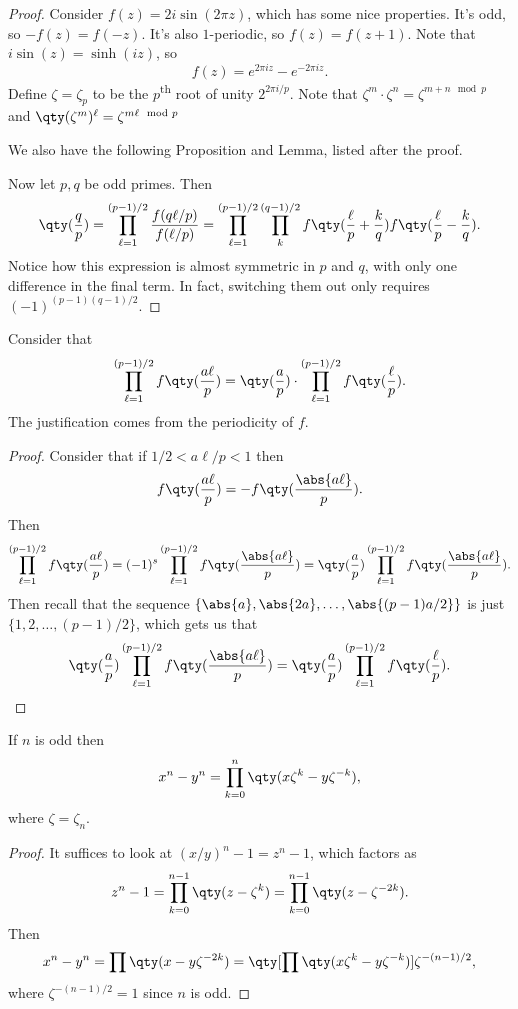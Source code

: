 \begin{proof}
Consider $f(z) = 2i\sin(2\pi z)$, which has some nice properties. It's odd, so $-f(z) = f(-z)$. It's also $1$-periodic, so $f(z) = f(z+1)$. Note that $i \sin(z) = \sinh(iz)$, so 
\[ f(z) = e^{2\pi i z} - e^{-2\pi i z}. \]
Define $\zeta = \zeta_p$ to be the $p$\textsuperscript{th} root of unity $2^{2\pi i/p}$. Note that $\zeta^m \cdot \zeta^n = \zeta^{m+n \mod p}$ and $\qty(\zeta^m)^\ell = \zeta^{m\ell \mod p}$

We also have the following Proposition and Lemma, listed after the proof.

Now let $p,q$ be odd primes. Then 
\[ \qty(\frac{q}{p}) = \prod_{\ell=1}^{(p-1)/2} \frac{f(q\ell/p)}{f(\ell/p)} = \prod_{\ell=1}^{(p-1)/2}\prod_k^{(q-1)/2} f\qty(\frac{\ell}{p} + \frac{k}{q})f\qty(\frac{\ell}{p} - \frac{k}{q}). \]
Notice how this expression is almost symmetric in $p$ and $q$, with only one difference in the final term. In fact, switching them out only requires $(-1)^{(p-1)(q-1)/2}$.
\end{proof}

\begin{proposition}\label{prop:periodicity}
Consider that
\[ \prod_{\ell = 1}^{(p-1)/2} f\qty(\frac{a\ell}{p}) = \qty(\frac{a}{p}) \cdot  \prod_{\ell = 1}^{(p-1)/2} f\qty(\frac{\ell}{p}).\]
The justification comes from the periodicity of $f$.
\end{proposition}

\begin{proof}
Consider that if $1/2 < a\ell/p < 1$ then 
\[ f\qty(\frac{a\ell}{p}) = -f\qty(\frac{\abs{a\ell}}{p}). \]
Then 
\[ \prod_{\ell = 1}^{(p-1)/2} f\qty(\frac{a\ell}{p}) = (-1)^s \prod_{\ell = 1}^{(p-1)/2} f\qty(\frac{\abs{a\ell}}{p}) = \qty(\frac{a}{p})\prod_{\ell = 1}^{(p-1)/2} f\qty(\frac{\abs{a\ell}}{p}). \]
Then recall that the sequence $\{\abs{a}, \abs{2a}, \dotsc, \abs{(p-1)a/2}\}$ is just $\{1, 2, \dotsc, (p-1)/2\}$, which gets us that 
\[ \qty(\frac{a}{p})\prod_{\ell = 1}^{(p-1)/2} f\qty(\frac{\abs{a\ell}}{p}) = \qty(\frac{a}{p})\prod_{\ell = 1}^{(p-1)/2} f\qty(\frac{\ell}{p}). \qedhere \]
\end{proof}

\begin{lemma}
If $n$ is odd then \[
x^n-y^n = \prod_{k=0}^n \qty(x\zeta^k - y\zeta^{-k}),
\]
where $\zeta = \zeta_n$.
\end{lemma}
\begin{proof}
It suffices to look at $(x/y)^n - 1 = z^n - 1$, which factors as 
\[ z^n - 1 = \prod_{k=0}^{n-1} \qty(z-\zeta^k) = \prod_{k=0}^{n-1} \qty(z-\zeta^{-2k}). \]
Then 
\[ x^n - y^n = \prod \qty(x-y\zeta^{-2k}) = \qty[\prod \qty(x\zeta^k - y\zeta^{-k})] \zeta^{-(n-1)/2}, \]
where $\zeta^{-(n-1)/2} = 1$ since $n$ is odd.
\end{proof}

